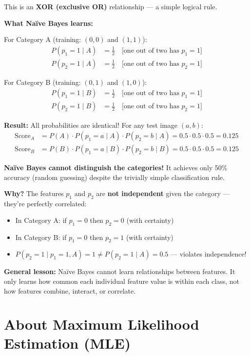 This is an \textbf{XOR (exclusive OR)} relationship — a simple logical rule.

\textbf{What Naïve Bayes learns:}

For Category A (training: $(0,0)$ and $(1,1)$):
\begin{align*}
P(p_1 = 1 \mid A) &= \frac{1}{2} \quad \text{[one out of two has } p_1=1\text{]} \\
P(p_2 = 1 \mid A) &= \frac{1}{2} \quad \text{[one out of two has } p_2=1\text{]}
\end{align*}

For Category B (training: $(0,1)$ and $(1,0)$):
\begin{align*}
P(p_1 = 1 \mid B) &= \frac{1}{2} \quad \text{[one out of two has } p_1=1\text{]} \\
P(p_2 = 1 \mid B) &= \frac{1}{2} \quad \text{[one out of two has } p_2=1\text{]}
\end{align*}

\textbf{Result:} All probabilities are identical! For any test image $(a,b)$:
\begin{align*}
\text{Score}_A &= P(A) \cdot P(p_1=a \mid A) \cdot P(p_2=b \mid A) = 0.5 \cdot 0.5 \cdot 0.5 = 0.125 \\
\text{Score}_B &= P(B) \cdot P(p_1=a \mid B) \cdot P(p_2=b \mid B) = 0.5 \cdot 0.5 \cdot 0.5 = 0.125
\end{align*}

\textbf{Naïve Bayes cannot distinguish the categories!} It achieves only 50\% accuracy (random guessing) despite the trivially simple classification rule.

\textbf{Why?} The features $p_1$ and $p_2$ are \textbf{not independent} given the category — they're perfectly correlated:
\begin{itemize}
    \item In Category A: if $p_1 = 0$ then $p_2 = 0$ (with certainty)
    \item In Category B: if $p_1 = 0$ then $p_2 = 1$ (with certainty)
    \item $P(p_2 = 1 \mid p_1 = 1, A) = 1 \neq P(p_2 = 1 \mid A) = 0.5$ — violates independence!
\end{itemize}

\textbf{General lesson:} Naïve Bayes cannot learn relationships between features. It only learns how common each individual feature value is within each class, not how features combine, interact, or correlate.

\section{About Maximum Likelihood Estimation (MLE)}

